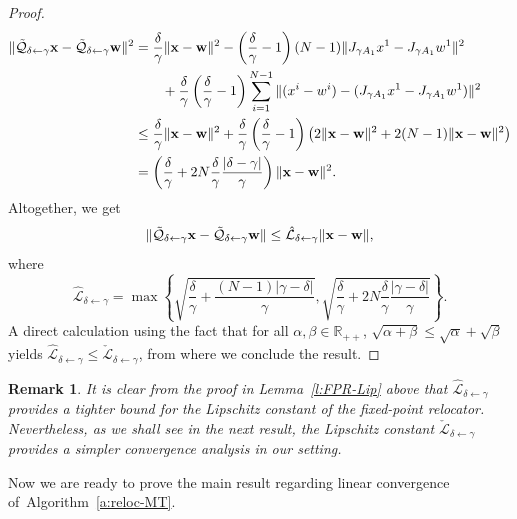 \documentclass[a4paper,12pt]{article}
\newtheorem{remark}[theorem]{Remark}
\begin{document}
\begin{proof}
\begin{align*}
    \|\mathcal{\Tilde{Q}}_{\delta\gets\gamma}\mathbf{x}-\mathcal{\Tilde{Q}}_{\delta\gets\gamma}\mathbf{w}\|^2
    &= \frac{\delta}{\gamma}\|\mathbf{x}-\mathbf{w}\|^2-\left(\frac{\delta}{\gamma}-1\right)(N-1)\|J_{\gamma A_1}x^1-J_{\gamma A_1}w^1\|^2 \\
    &\qquad + \frac{\delta}{\gamma}\left(\frac{\delta}{\gamma}-1\right)\sum_{i=1}^{N-1}\|(x^i-w^i)-(J_{\gamma A_1}x^1-J_{\gamma A_1}w^1)\|^2\\
    &\leq \frac{\delta}{\gamma}\|\mathbf{x}-\mathbf{w}\|^2 + \frac{\delta}{\gamma}\left(\frac{\delta}{\gamma}-1\right)\left(2\|\mathbf{x}-\mathbf{w}\|^2+2(N-1)\|\mathbf{x}-\mathbf{w}\|^2\right)\\
    &= \left(\frac{\delta}{\gamma}+2N\frac{\delta}{\gamma}\frac{|\delta-\gamma|}{\gamma}\right)\|\mathbf{x}-\mathbf{w}\|^2.
\end{align*}
Altogether, we get \begin{equation*}
        \|\mathcal{\Tilde{Q}}_{\delta\gets\gamma}\mathbf{x}-\mathcal{\Tilde{Q}}_{\delta\gets\gamma}\mathbf{w}\|\leq \hat{\mathcal{L}}_{\delta\gets\gamma}\|\mathbf{x}-\mathbf{w}\|,
    \end{equation*} where \begin{equation*}
        \hat{\mathcal{L}}_{\delta\gets\gamma}=\max\left\{ \sqrt{\frac{\delta}{\gamma} + \frac{(N-1)|\gamma-\delta|}{\gamma}}, \sqrt{\frac{\delta}{\gamma} + 2N \frac{\delta}{\gamma}\frac{|\gamma-\delta|}{\gamma}}\right\}.
    \end{equation*} A direct calculation using the fact that for all $\alpha,\beta \in \mathbb{R}_{++}$, $\sqrt{\alpha + \beta} \leq \sqrt{\alpha} + \sqrt{\beta} $ yields $\hat{\mathcal{L}}_{\delta\gets\gamma} \leq \check{\mathcal{L}}_{\delta\gets\gamma}$, from where we conclude the result.
\end{proof}


\begin{remark}
    It is clear from the proof in Lemma~\ref{l:FPR-Lip} above that $\hat{\mathcal{L}}_{\delta\gets\gamma}$ provides a tighter bound for the Lipschitz constant of the fixed-point relocator. Nevertheless, as we shall see in the next result, the Lipschitz constant $\check{\mathcal{L}}_{\delta\gets\gamma}$ provides a simpler convergence analysis in our setting.
\end{remark}


Now we are ready to prove the main result regarding linear convergence of~Algorithm~\ref{a:reloc-MT}.
\end{document}
